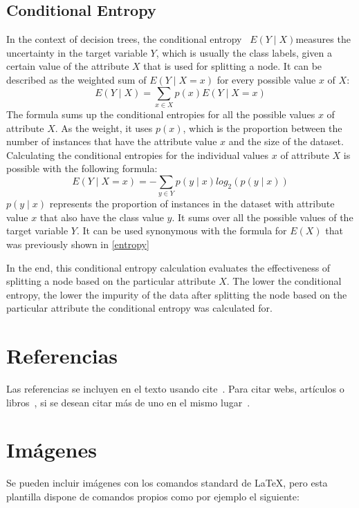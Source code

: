 \subsection{Conditional Entropy}
In the context of decision trees, the conditional entropy~\cite{conditional_entropy_wiki} $E(Y\mid X)$measures the uncertainty in the target variable $Y$, which is usually the class labels, given a certain value of the attribute $X$ that is used for splitting a node.
It can be described as the weighted sum of $E(Y\mid X = x)$ for every possible value $x$ of $X$:
\[E(Y\mid X) = \sum_{x \in X} {p(x)} {E(Y\mid X = x)}\]
The formula sums up the conditional entropies for all the possible values $x$ of attribute $X$. As the weight, it uses $p(x)$, which is the proportion between the number of instances that have the attribute value $x$ and the size of the dataset.
Calculating the conditional entropies for the individual values $x$ of attribute $X$ is possible with the following formula:
\[ E(Y\mid X = x) = -\sum_{y \in Y} {p(y\mid x)} {log_2 {(p(y\mid x))}} \]
$p(y\mid x)$ represents the proportion of instances in the dataset with attribute value $x$ that also have the class value $y$. It sums over all the possible values of the target variable $Y$. It can be used synonymous with the formula for $E(X)$ that was previously shown in \ref{entropy}

In the end, this conditional entropy calculation evaluates the effectiveness of splitting a node based on the particular attribute $X$. The lower the conditional entropy, the lower the impurity of the data after splitting the node based on the particular attribute the conditional entropy was calculated for.

\section{Referencias}

Las referencias se incluyen en el texto usando cite~\cite{wiki:latex}. Para citar webs, artículos o libros~\cite{koza92}, si se desean citar más de uno en el mismo lugar~\cite{bortolot2005, koza92}.


\section{Imágenes}

Se pueden incluir imágenes con los comandos standard de \LaTeX, pero esta plantilla dispone de comandos propios como por ejemplo el siguiente:

